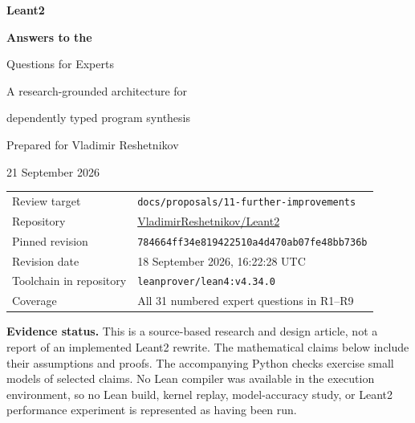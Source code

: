 \documentclass[11pt,a4paper]{article}
\newcommand{\code}[1]{\nolinkurl{#1}}
\theoremstyle{remark}
\begin{document}
\begin{titlepage}
\vspace*{13mm}
\noindent{\color{ink}\rule{\textwidth}{1.2pt}}\par
\vspace{10mm}
{\Huge\bfseries\color{ink}Leant2\par}
\vspace{4mm}
{\LARGE\bfseries Answers to the\par Questions for Experts\par}
\vspace{8mm}
{\Large A research-grounded architecture for\par dependently typed program synthesis\par}
\vspace{14mm}
{\large Prepared for Vladimir Reshetnikov\par}
{\large 21 September 2026\par}
\vspace{13mm}
\noindent\begin{tabularx}{\textwidth}{@{}P{32mm}Y@{}}
\toprule
Review target & \code{docs/proposals/11-further-improvements}\\
Repository & \href{https://github.com/VladimirReshetnikov/Leant2}{VladimirReshetnikov/Leant2}\\
Pinned revision & \texttt{784664ff34e819422510a4d470ab07fe48bb736b}\\
Revision date & 18 September 2026, 16:22:28 UTC\\
Toolchain in repository & \code{leanprover/lean4:v4.34.0}\\
Coverage & All 31 numbered expert questions in R1--R9\\
\bottomrule
\end{tabularx}
\vfill
\noindent\textbf{Evidence status.} This is a source-based research and design article, not a report of an implemented Leant2 rewrite. The mathematical claims below include their assumptions and proofs. The accompanying Python checks exercise small models of selected claims. No Lean compiler was available in the execution environment, so no Lean build, kernel replay, model-accuracy study, or Leant2 performance experiment is represented as having been run.
\end{titlepage}
\end{document}

